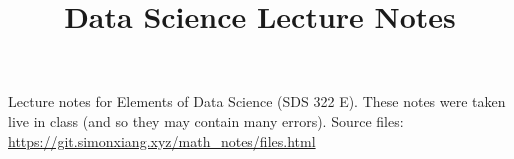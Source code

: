 \documentclass[fontsize=9pt]{article}
\title{Data Science Lecture Notes}
\date{}
\begin{document}
\maketitle
Lecture notes for Elements of Data Science (SDS 322 E). These notes were taken live in class (and so they may contain many errors). Source files: \url{https://git.simonxiang.xyz/math_notes/files.html}

\tableofcontents
\newpage
    
    
\end{document}
